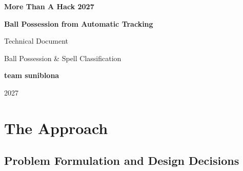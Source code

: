 \documentclass[11pt,a4paper]{article}
\begin{document}

\begin{titlepage}
    \centering

    \vspace*{2.2cm}

    {\Large\bfseries More Than A Hack 2027\par}

    \vspace{0.8cm}

    {\huge\bfseries Ball Possession from Automatic Tracking\par}

    \vspace{0.35cm}

    {\Large Technical Document\par}

    \vspace{1.2cm}

    {\large Ball Possession \& Spell Classification\par}

    \vfill

    {\large\bfseries team suniblona\par}

    \vspace{0.5cm}

    {\large 2027\par}

    \vspace*{1.5cm}
\end{titlepage}


\tableofcontents
\clearpage
{}


\section{The Approach}

\subsection{Problem Formulation and Design Decisions}
\end{document}
